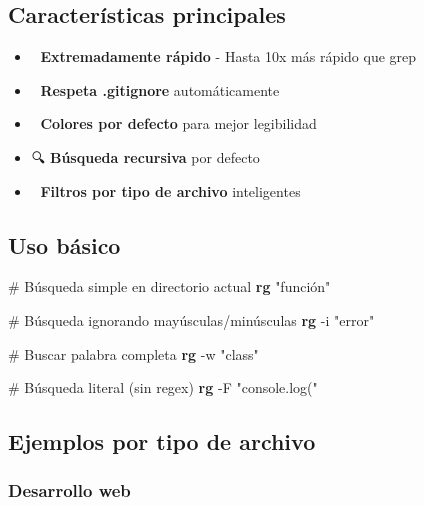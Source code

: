 \documentclass[
  11pt,
  letterpaper,
  oneside,
  openany]{scrbook}
\newenvironment{Shaded}{}{}
\newcommand{\AttributeTok}[1]{\textcolor[rgb]{0.84,0.23,0.29}{#1}}
\newcommand{\CommentTok}[1]{\textcolor[rgb]{0.42,0.45,0.49}{#1}}
\newcommand{\ExtensionTok}[1]{\textcolor[rgb]{0.84,0.23,0.29}{\textbf{#1}}}
\newcommand{\StringTok}[1]{\textcolor[rgb]{0.01,0.18,0.38}{#1}}
\providecommand{\tightlist}{%
  \setlength{\itemsep}{0pt}\setlength{\parskip}{0pt}}
\begin{document}
\subsection{Características
principales}\label{caracteruxedsticas-principales}

\begin{itemize}
\tightlist
\item
  🚀 \textbf{Extremadamente rápido} - Hasta 10x más rápido que grep
\item
  🎯 \textbf{Respeta .gitignore} automáticamente
\item
  🌈 \textbf{Colores por defecto} para mejor legibilidad
\item
  🔍 \textbf{Búsqueda recursiva} por defecto
\item
  📁 \textbf{Filtros por tipo de archivo} inteligentes
\end{itemize}

\subsection{Uso básico}\label{uso-buxe1sico-3}

\begin{Shaded}
\begin{Highlighting}[]
\CommentTok{\# Búsqueda simple en directorio actual}
\ExtensionTok{rg} \StringTok{"función"}

\CommentTok{\# Búsqueda ignorando mayúsculas/minúsculas}
\ExtensionTok{rg} \AttributeTok{{-}i} \StringTok{"error"}

\CommentTok{\# Buscar palabra completa}
\ExtensionTok{rg} \AttributeTok{{-}w} \StringTok{"class"}

\CommentTok{\# Búsqueda literal (sin regex)}
\ExtensionTok{rg} \AttributeTok{{-}F} \StringTok{"console.log("}
\end{Highlighting}
\end{Shaded}

\subsection{Ejemplos por tipo de
archivo}\label{ejemplos-por-tipo-de-archivo}

\subsubsection{Desarrollo web}\label{desarrollo-web}
\end{document}
